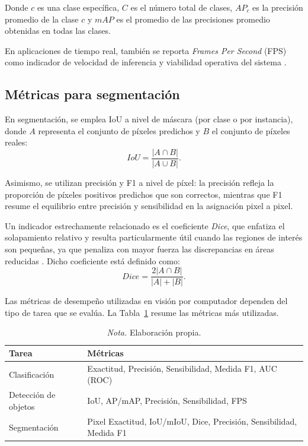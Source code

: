 Donde $c$ es una clase específica, $C$ es el número total de clases, $AP_c$ es la  precisión promedio de la clase $c$ y $mAP$ es el promedio de las precisiones promedio  obtenidas en todas las clases.

En aplicaciones de tiempo real, también se reporta \textit{Frames Per Second} (FPS) como indicador de velocidad de inferencia y viabilidad operativa del sistema \parencite{saetchnikov2021uav}.

\subsection{Métricas para segmentación}

En segmentación, se emplea IoU a nivel de máscara (por clase o por instancia), donde $A$ representa el conjunto de píxeles predichos y $B$ el conjunto de píxeles reales:
\[
IoU=\frac{|A\cap B|}{|A\cup B|}.
\]

Asimismo, se utilizan precisión y F1 a nivel de píxel: la precisión refleja la proporción de píxeles positivos predichos que son correctos, mientras que F1 resume el equilibrio entre precisión y sensibilidad en la asignación pixel a pixel.

Un indicador estrechamente relacionado es el coeficiente \textit{Dice}, que enfatiza el solapamiento relativo y resulta particularmente útil cuando las regiones de interés son pequeñas, ya que penaliza con mayor fuerza las discrepancias en áreas reducidas \parencite{varadarajan2021multiscale}. Dicho coeficiente está definido como:
\[
Dice=\frac{2|A\cap B|}{|A|+|B|}.
\]

Las métricas de desempeño utilizadas en visión por computador dependen del tipo de tarea que se evalúa. La Tabla~\ref{tab:metricas-por-tarea} resume las métricas más utilizadas. \\


\begin{table}[H]
    \centering
    \caption{Métricas por tarea}
    \small
    \label{tab:metricas-por-tarea}
    \begin{tabular}{p{3.2cm} p{9.2cm}}
    \hline
    \textbf{Tarea} & \textbf{Métricas} \\
    \hline
    Clasificación & Exactitud, Precisión, Sensibilidad, Medida F1, AUC (ROC) \\
    Detección de objetos & IoU, AP/mAP, Precisión, Sensibilidad, FPS \\
    Segmentación & Pixel Exactitud, IoU/mIoU, Dice, Precisión, Sensibilidad, Medida F1 \\
    \hline
    \end{tabular}
    \caption*{\normalfont\normalsize\textit{Nota.} Elaboración propia.}
\end{table}

